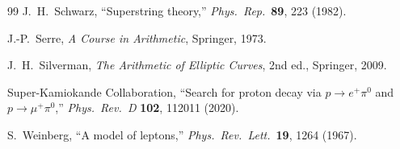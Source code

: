 \documentclass[11pt,letterpaper]{article}
\theoremstyle{definition}
\theoremstyle{remark}
\begin{document}
\begin{thebibliography}{99}
J.~H.~Schwarz, ``Superstring theory,''
\textit{Phys.\ Rep.}\ \textbf{89}, 223 (1982).

J.-P.~Serre, \textit{A Course in Arithmetic}, Springer, 1973.

J.~H.~Silverman, \textit{The Arithmetic of Elliptic Curves},
2nd ed., Springer, 2009.

Super-Kamiokande Collaboration, ``Search for proton decay via 
$p \to e^+\pi^0$ and $p \to \mu^+\pi^0$,''
\textit{Phys.\ Rev.\ D} \textbf{102}, 112011 (2020).

S.~Weinberg, ``A model of leptons,''
\textit{Phys.\ Rev.\ Lett.}\ \textbf{19}, 1264 (1967).

\end{thebibliography}
\end{document}
